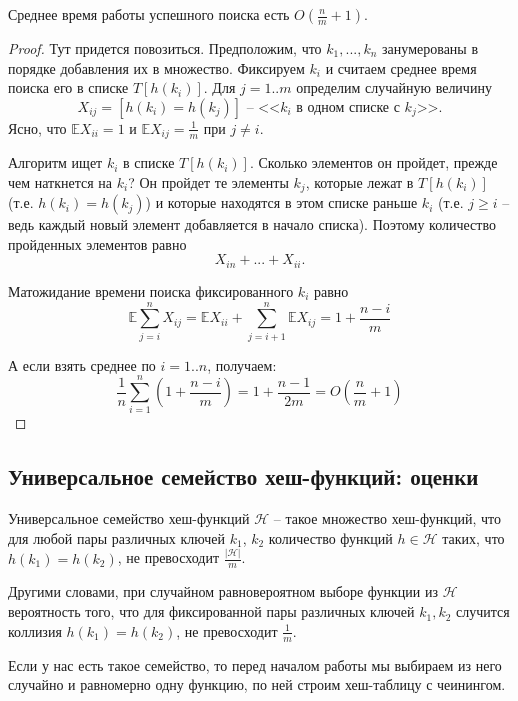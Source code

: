 \begin{theorem*}
	Среднее время работы успешного поиска есть $O\left(\frac{n}{m}+1\right)$.
\end{theorem*}
\begin{proof}
Тут придется повозиться. Предположим, что $k_1, ..., k_n$ занумерованы в порядке добавления их в множество. Фиксируем $k_i$ и считаем среднее время поиска его в списке $T[h(k_i)]$. Для $j=1..m$ определим случайную величину $$X_{ij} = [h(k_i) = h(k_j)] \text{ -- <<$k_i$ в одном списке с $k_j$>>.}$$ Ясно, что $\mathbb E X_{ii} = 1$ и $\mathbb E X_{ij} = \frac{1}{m}$ при $j\neq i$.

Алгоритм ищет $k_i$ в списке $T[h(k_i)]$. Сколько элементов он пройдет, прежде чем наткнется на $k_i$? Он пройдет те элементы $k_j$, которые лежат в $T[h(k_i)]$ (т.е. $h(k_i)=h(k_j)$) и которые находятся в этом списке раньше $k_i$ (т.е. $j\geq i$ -- ведь каждый новый элемент добавляется в начало списка). Поэтому количество пройденных элементов равно $$X_{in} + ... + X_{ii}.$$

Матожидание времени поиска фиксированного $k_i$ равно $$\mathbb E \sum_{j=i}^n X_{ij} = \mathbb E X_{ii} + \sum_{j=i+1}^n \mathbb E X_{ij} = 1 + \frac{n-i}{m}$$

А если взять среднее по $i=1..n$, получаем: $$\frac{1}{n} \sum_{i=1}^n\left(1+\frac{n-i}{m}\right) = 1 + \frac{n-1}{2m} = O\left(\frac{n}{m} + 1\right)$$
\end{proof}

\subsection{Универсальное семейство хеш-функций: оценки}

\begin{definition*}
	Универсальное семейство хеш-функций $\mathcal{H}$ -- такое множество хеш-функций, что для любой пары различных ключей $k_1$, $k_2$ количество функций $h \in \mathcal{H}$ таких, что $h(k_1) = h(k_2)$, не превосходит $\frac{|\mathcal{H}|}{m}$.
\end{definition*}

 Другими словами, при случайном равновероятном выборе функции из $\mathcal{H}$ вероятность того, что для фиксированной пары различных ключей $k_1, k_2$ случится коллизия $h(k_1) = h(k_2)$, не превосходит $\frac{1}{m}$.

Если у нас есть такое семейство, то перед началом работы мы выбираем из него случайно и равномерно одну функцию, по ней строим хеш-таблицу с чеинингом.

